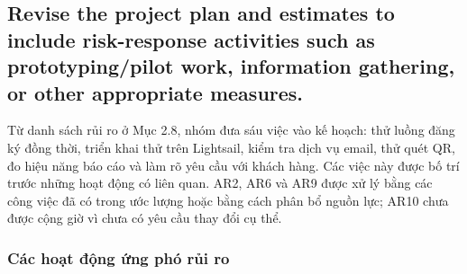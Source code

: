 \subsection{Revise the project plan and estimates to include risk-response activities such as prototyping/pilot work, information gathering, or other appropriate measures.}

Từ danh sách rủi ro ở Mục 2.8, nhóm đưa sáu việc vào kế hoạch: thử luồng đăng ký đồng thời, triển khai thử trên Lightsail, kiểm tra dịch vụ email, thử quét QR, đo hiệu năng báo cáo và làm rõ yêu cầu với khách hàng. Các việc này được bố trí trước những hoạt động có liên quan. AR2, AR6 và AR9 được xử lý bằng các công việc đã có trong ước lượng hoặc bằng cách phân bổ nguồn lực; AR10 chưa được cộng giờ vì chưa có yêu cầu thay đổi cụ thể.

\subsubsection{Các hoạt động ứng phó rủi ro}

